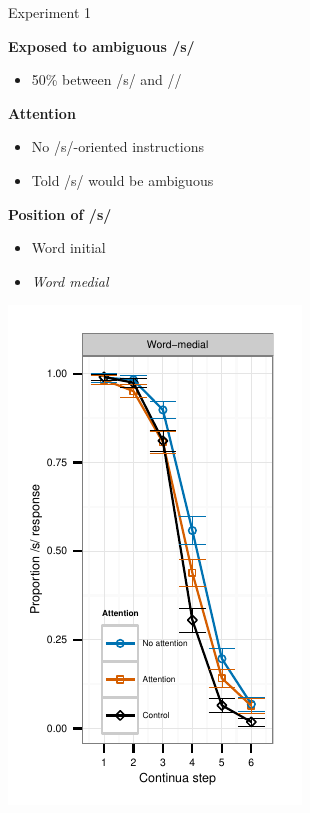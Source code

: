 \documentclass{beamer}
\begin{document}
\begin{frame}{Experiment 1}

\begin{minipage}{0.45\textwidth}
\textbf{Exposed to ambiguous /s/}
\begin{itemize}
\item 50\% between /s/ and /\textesh/
\end{itemize}

\textbf{Attention}
\begin{itemize}
\item No /s/-oriented instructions
\item Told /s/ would be ambiguous
\end{itemize}

\textbf{Position of /s/}
\begin{itemize}
\item Word initial
\item \emph{Word medial}
\end{itemize}
\end{minipage}
\hfill
\begin{minipage}{0.45\textwidth}
\includegraphics{graphs/exp1_categresults_present2-final}
\end{minipage}

\end{frame}
\end{document}
